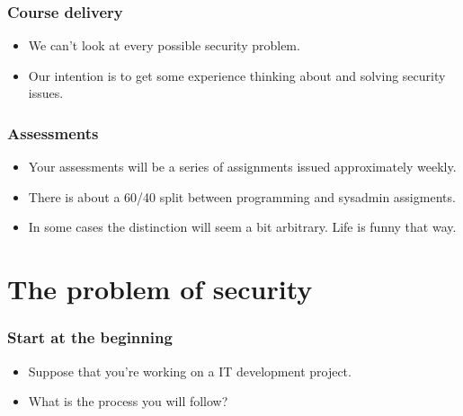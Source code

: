 \documentclass[10pt]{beamer}
\begin{document}
\begin{frame}
	\frametitle{Course delivery}

	\begin{itemize}
		\item We can't look at every possible security problem.
		\item Our intention is to get some experience thinking about
			and solving security issues.
	\end{itemize}
\end{frame}

\begin{frame}
	\frametitle{Assessments}

	\begin{itemize}
		\item Your assessments will be a series of assignments issued 
			approximately weekly.
		\item There is about a 60/40 split between programming and
			sysadmin assigments.
		\item In some cases  the distinction will seem a bit arbitrary.
			Life is funny that way.
	\end{itemize}
\end{frame}

\section{The problem of security}

\begin{frame}
    \frametitle{Start at the beginning}
    \begin{itemize}
	    \item Suppose that you're working on a IT development project.
	    \item What is the process you will follow?
    \end{itemize}
\end{frame}
\end{document}
